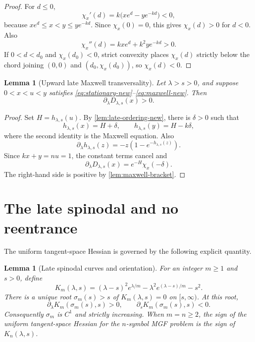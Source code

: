 \documentclass[11pt]{article}
\theoremstyle{plain}
\newtheorem{lemma}[theorem]{Lemma}
\theoremstyle{definition}
\theoremstyle{remark}
\begin{document}
\begin{proof}
For \(d\le0\),
\[
\chi_x'(d)=k\bigl(xe^d-ye^{-kd}\bigr)<0,
\]
because \(xe^d\le x<y\le ye^{-kd}\).  Since \(\chi_x(0)=0\), this gives \(\chi_x(d)>0\) for \(d<0\).  Also
\[
\chi_x''(d)=kx e^d+k^2y e^{-kd}>0.
\]
If \(0<d<d_0\) and \(\chi_x(d_0)<0\), strict convexity places \(\chi_x(d)\) strictly below the chord joining \((0,0)\) and \((d_0,\chi_x(d_0))\), so \(\chi_x(d)<0\).
\end{proof}

\begin{lemma}[Upward late Maxwell transversality]\label{lem:upward-transversality-new}
Let \(\lambda>s>0\), and suppose \(0<x<u<y\) satisfies \eqref{eq:stationary-new}--\eqref{eq:maxwell-new}.  Then
\begin{equation}\label{eq:Dlambda-pos-new}
\partial_\lambda D_{\lambda,s}(x)>0.
\end{equation}
\end{lemma}

\begin{proof}
Set \(H=h_{\lambda,s}(u)\).  By \cref{lem:late-ordering-new}, there is \(\delta>0\) such that
\[
h_{\lambda,s}(x)=H+\delta,
\qquad
h_{\lambda,s}(y)=H-k\delta,
\]
where the second identity is the Maxwell equation.  Also
\begin{equation}\label{eq:hlambda-derivative}
\partial_\lambda h_{\lambda,s}(z)
=-z\left(1-e^{-h_{\lambda,s}(z)}\right).
\end{equation}
Since \(kx+y=nu=1\), the constant terms cancel and
\begin{equation}\label{eq:Dlambda-chi}
\partial_\lambda D_{\lambda,s}(x)
=e^{-H}\chi_x(-\delta).
\end{equation}
The right-hand side is positive by \cref{lem:maxwell-bracket}.
\end{proof}

\section{The late spinodal and no reentrance}

The uniform tangent-space Hessian is governed by the following explicit quantity.

\begin{lemma}[Late spinodal curves and orientation]\label{lem:spinodal-strong}
For an integer \(m\ge1\) and \(s>0\), define
\begin{equation}\label{eq:K-new}
K_m(\lambda,s)
=(\lambda-s)^2e^{\lambda/m}
-\lambda^2e^{(\lambda-s)/m}-s^2.
\end{equation}
There is a unique root \(\sigma_m(s)>s\) of \(K_m(\lambda,s)=0\) on \([s,\infty)\).  At this root,
\begin{equation}\label{eq:K-orientation}
\partial_\lambda K_m(\sigma_m(s),s)>0,
\qquad
\partial_s K_m(\sigma_m(s),s)<0.
\end{equation}
Consequently \(\sigma_m\) is \(C^1\) and strictly increasing.  When \(m=n\ge2\), the sign of the uniform tangent-space Hessian for the \(n\)-symbol MGF problem is the sign of \(K_n(\lambda,s)\).
\end{lemma}
\end{document}
